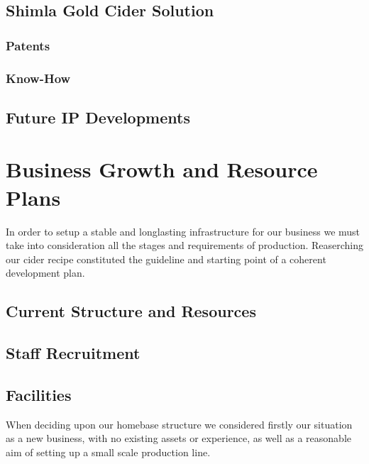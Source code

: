 \documentclass[11pt]{article}
\begin{document}
  \subsection{Shimla Gold Cider Solution}
    \subsubsection{Patents}
    \subsubsection{Know-How}
  \subsection{Future IP Developments}

\newpage

\section{Business Growth and Resource Plans}
In order to setup a stable and longlasting infrastructure for our business we must take into consideration all the stages and requirements of production. Reaserching our cider recipe constituted the guideline and starting point of a coherent development plan. 

  \subsection{Current Structure and Resources}

  \subsection{Staff Recruitment}
  \subsection{Facilities}
\newpage

When deciding upon our homebase structure we considered firstly our situation as a new business, with no existing assets or experience, as well as a reasonable aim of setting up a small scale production line. \\
\end{document}
